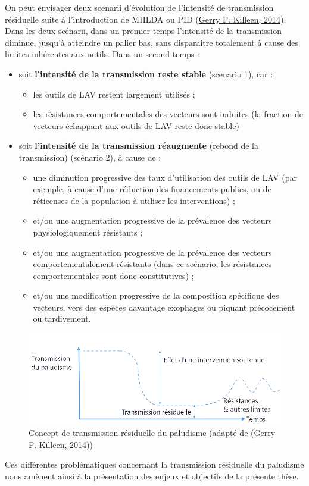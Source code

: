 \documentclass[12pt,twoside]{reedthesis}
\providecommand{\tightlist}{%
  \setlength{\itemsep}{0pt}\setlength{\parskip}{0pt}}
\begin{document}
On peut envisager deux scenarii d'évolution de l'intensité de transmission résiduelle suite à l'introduction de MIILDA ou PID (\protect\hyperlink{ref-killeen_characterizing_2014}{Gerry F. Killeen, 2014}). Dans les deux scénarii, dans un premier temps l'intensité de la transmission diminue, jusqu'à atteindre un palier bas, sans disparaitre totalement à cause des limites inhérentes aux outils. Dans un second temps :
\begin{itemize}
\tightlist
\item
  soit \textbf{l'intensité de la transmission reste stable} (scenario 1), car :
  \begin{itemize}
  \tightlist
  \item
    les outils de LAV restent largement utilisés ;
  \item
    les résistances comportementales des vecteurs sont induites (la fraction de vecteurs échappant aux outils de LAV reste donc stable)
  \end{itemize}
\item
  soit \textbf{l'intensité de la transmission réaugmente} (rebond de la transmission) (scénario 2), à cause de :
  \begin{itemize}
  \tightlist
  \item
    une diminution progressive des taux d'utilisation des outils de LAV (par exemple, à cause d'une réduction des financements publics, ou de réticenses de la population à utiliser les interventions) ;
  \item
    et/ou une augmentation progressive de la prévalence des vecteurs physiologiquement résistants ;
  \item
    et/ou une augmentation progressive de la prévalence des vecteurs comportementalement résistants (dans ce scénario, les résistances comportementales sont donc constitutives) ;
  \item
    et/ou une modification progressive de la composition spécifique des vecteurs, vers des espèces davantage exophages ou piquant précocement ou tardivement.
  \end{itemize}
\end{itemize}
\begin{figure}

{\centering \includegraphics[width=0.9\linewidth]{figure/tr_schema} 

}

\caption[Concept de transmission résiduelle du paludisme]{Concept de transmission résiduelle du paludisme (adapté de (\protect\hyperlink{ref-killeen_characterizing_2014}{Gerry F. Killeen, 2014}))}\label{fig:tr-schema}
\end{figure}
Ces différentes problématiques concernant la transmission résiduelle du paludisme nous amènent ainsi à la présentation des enjeux et objectifs de la présente thèse.
\end{document}
